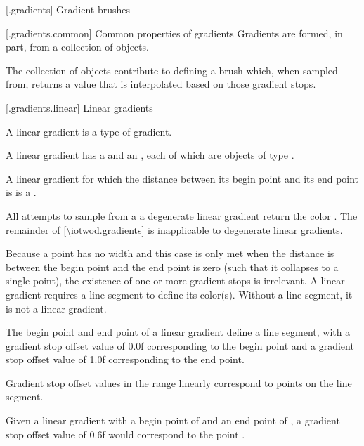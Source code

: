  [\iotwod.gradients] {Gradient brushes}

 [\iotwod.gradients.common] {Common properties of gradients}
\pnum
Gradients are formed, in part, from a collection of  objects.

\pnum
The collection of  objects contribute to defining a brush which, when sampled from, returns a value that is interpolated based on those gradient stops.

 [\iotwod.gradients.linear] {Linear gradients}

\pnum
A linear gradient is a type of gradient.

\pnum
A linear gradient has a  and an , each of which are objects of type .

\pnum
A linear gradient for which the distance between its begin point and its end point is  is a .

\pnum
All attempts to sample from a a degenerate linear gradient return the color . The remainder of \ref{\iotwod.gradients} is inapplicable to degenerate linear gradients.
\begin{note}
Because a point has no width and this case is only met when the distance is between the begin point and the end point is zero (such that it collapses to a single point), the existence of one or more gradient stops is irrelevant. A linear gradient requires a line segment to define its color(s). Without a line segment, it is not a linear gradient.
\end{note}

\pnum
The begin point and end point of a linear gradient define a line segment, with a gradient stop offset value of 0.0f corresponding to the begin point and a gradient stop offset value of 1.0f corresponding to the end point.

\pnum
Gradient stop offset values in the range  linearly correspond to points on the line segment.

\pnum
\begin{example}
Given a linear gradient with a begin point of  and an end point of , a gradient stop offset value of 0.6f would correspond to the point .
\end{example}

